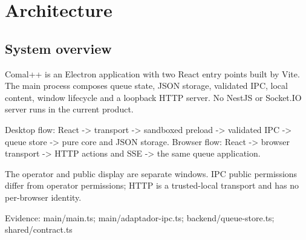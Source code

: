 \section{Architecture}
\subsection{System overview}

Comal++ is an Electron application with two React entry points built by Vite. The main process composes queue state, JSON storage, validated IPC, local content, window lifecycle and a loopback HTTP server. No NestJS or Socket.IO server runs in the current product.

Desktop flow: React -> transport -> sandboxed preload -> validated IPC -> queue store -> pure core and JSON storage. Browser flow: React -> browser transport -> HTTP actions and SSE -> the same queue application.

The operator and public display are separate windows. IPC public permissions differ from operator permissions; HTTP is a trusted-local transport and has no per-browser identity.

Evidence: main/main.ts; main/adaptador-ipc.ts; backend/queue-store.ts; shared/contract.ts
